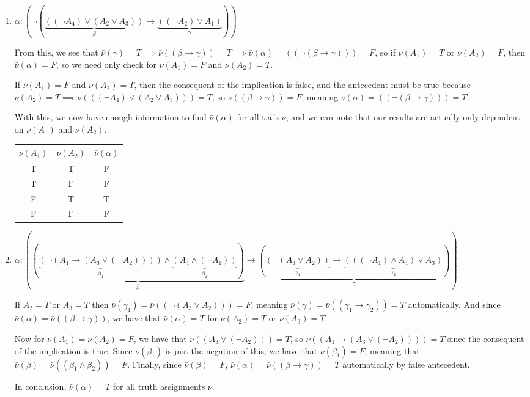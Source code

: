 \documentclass[11pt]{article}
\newcommand{\n}{\vspace{0.5cm}}
\begin{document}
  \begin{enumerate}[label=(\alph*)]
    \item \(\alpha \colon (\neg (\underbrace{((\neg A_4) \vee (A_2 \vee A_3))}_{\beta} \to \underbrace{((\neg A_2) \vee A_1)}_{\gamma}))\)

      From this, we see that \(\bar\nu(\gamma) = T \implies \bar\nu((\beta \to \gamma)) = T \implies \bar\nu(\alpha) = ((\neg (\beta \to \gamma))) = F\), so if \(\nu(A_1) = T\) or \(\nu(A_2) = F\), then \(\bar\nu(\alpha) = F\), so we need only check for \(\nu(A_1) = F\) and \(\nu(A_2) = T\). \n

      If \(\nu(A_1) = F\) and \(\nu(A_2) = T\), then the consequent of the implication is false, and the antecedent must be true because \(\nu(A_2) = T \implies \bar\nu(((\neg A_4) \vee (A_2 \vee A_3))) = T\), so \(\bar\nu((\beta \to \gamma)) = F\), meaning \(\bar\nu(\alpha) = ((\neg (\beta \to \gamma))) = T\). \n

      With this, we now have enough information to find \(\bar\nu(\alpha)\) for all t.a.'s \(\nu\), and we can note that our results are actually only dependent on \(\nu(A_1)\) and \(\nu(A_2)\).
      \begin{center}
        \begin{tabular}[c]{c|c|c}
          \(\nu(A_1)\) & \(\nu(A_2)\) & \(\bar\nu(\alpha)\) \\
          \hline
          T & T & F \\
          T & F & F \\
          F & T & T \\
          F & F & F \\
        \end{tabular}
      \end{center} \n
      

    \item \(\alpha \colon (\underbrace{(\underbrace{(\neg (A_1 \to (A_3 \vee (\neg A_2))))}_{\beta_1} \wedge \underbrace{(A_4 \wedge (\neg A_1))}_{\beta_2})}_{\beta} \to \underbrace{(\underbrace{(\neg (A_3 \vee A_2))}_{\gamma_1} \to \underbrace{(((\neg A_1) \wedge A_4) \vee A_3)}_{\gamma_2})}_{\gamma})\)

      If \(A_2 = T\) or \(A_3 = T\) then \(\bar\nu(\gamma_1) = \bar\nu((\neg (A_3 \vee A_2))) = F\), meaning \(\bar\nu(\gamma) = \bar\nu((\gamma_1 \to \gamma_2)) = T\) automatically.  And since \(\bar\nu(\alpha) = \bar\nu((\beta \to \gamma))\), we have that \(\bar\nu(\alpha) = T\) for \(\nu(A_2) = T\) or \(\nu(A_3) = T\). \n

      Now for \(\nu(A_1) = \nu(A_2) = F\), we have that \(\bar\nu((A_3 \vee (\neg A_2))) = T\), so \(\bar\nu((A_1 \to (A_3 \vee (\neg A_2)))) = T\) since the consequent of the implication is true.  Since \(\bar\nu(\beta_1)\) is just the negation of this, we have that \(\bar\nu(\beta_1) = F\), meaning that \(\bar\nu(\beta) = \bar\nu((\beta_1 \wedge \beta_2)) = F\).  Finally, since \(\bar\nu(\beta) = F\), \(\bar\nu(\alpha) = \bar\nu((\beta \to \gamma)) = T\) automatically by false antecedent. \n

      In conclusion, \(\bar\nu(\alpha) = T\) for all truth assignments \(\nu\).
  \end{enumerate}
\end{document}
